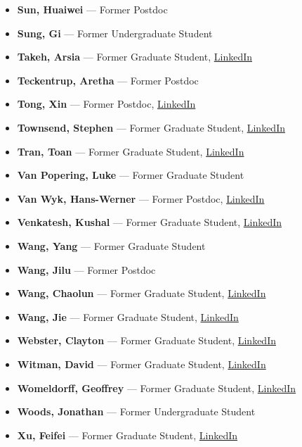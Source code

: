 \documentclass[12pt,a4paper]{article}
\begin{document}
\begin{itemize}
    \item \textbf{Sun, Huaiwei} --- Former Postdoc
    \item \textbf{Sung, Gi} --- Former Undergraduate Student
    \item \textbf{Takeh, Arsia} --- Former Graduate Student, \href{https://www.linkedin.com/in/arsia-takeh-b6205932/}{LinkedIn}
    \item \textbf{Teckentrup, Aretha} --- Former Postdoc
    \item \textbf{Tong, Xin} --- Former Postdoc, \href{https://www.linkedin.com/in/xin-tong-3980313a/}{LinkedIn}
    \item \textbf{Townsend, Stephen} --- Former Graduate Student, \href{https://www.linkedin.com/in/stephen-townsend-88225096/}{LinkedIn}
    \item \textbf{Tran, Toan} --- Former Graduate Student, \href{https://www.linkedin.com/in/toan-tran-6b3a03195/}{LinkedIn}
    \item \textbf{Van Popering, Luke} --- Former Graduate Student
    \item \textbf{Van Wyk, Hans-Werner} --- Former Postdoc, \href{https://www.linkedin.com/in/hvanwyk/}{LinkedIn}
    \item \textbf{Venkatesh, Kushal} --- Former Graduate Student, \href{https://www.linkedin.com/in/kushal-venkatesh-29896752/}{LinkedIn}
    \item \textbf{Wang, Yang} --- Former Graduate Student
    \item \textbf{Wang, Jilu} --- Former Postdoc
    \item \textbf{Wang, Chaolun} --- Former Graduate Student, \href{https://www.linkedin.com/in/chaolun-wang-b4703a110/}{LinkedIn}
    \item \textbf{Wang, Jie} --- Former Graduate Student, \href{https://www.linkedin.com/in/jie-wang-53372221/}{LinkedIn}
    \item \textbf{Webster, Clayton} --- Former Graduate Student, \href{https://www.linkedin.com/in/clayton-webster-3b478313/}{LinkedIn}
    \item \textbf{Witman, David} --- Former Graduate Student, \href{https://www.linkedin.com/in/david-witman-49931b74/}{LinkedIn}
    \item \textbf{Womeldorff, Geoffrey} --- Former Graduate Student, \href{https://www.linkedin.com/in/geoffrey-womeldorff-48425211/}{LinkedIn}
    \item \textbf{Woods, Jonathan} --- Former Undergraduate Student
    \item \textbf{Xu, Feifei} --- Former Graduate Student, \href{https://www.linkedin.com/in/feifei-xu-373b9840/}{LinkedIn}

\end{itemize}
\end{document}
